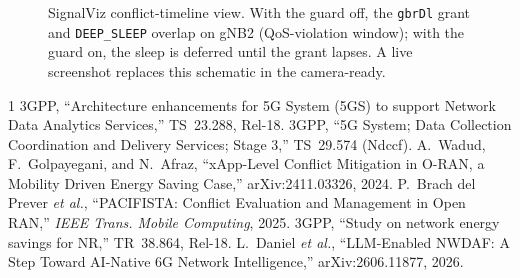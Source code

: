 \documentclass[conference]{IEEEtran}
\begin{document}

\begin{figure}[!t]
\centering
\caption{SignalViz conflict-timeline view. With the guard off, the
\texttt{gbrDl} grant and \texttt{DEEP\_SLEEP} overlap on gNB2 (QoS-violation
window); with the guard on, the sleep is deferred until the grant lapses. A
live screenshot replaces this schematic in the camera-ready.}
\label{fig:tl}
\end{figure}

\begin{thebibliography}{1}
 3GPP, ``Architecture enhancements for 5G System (5GS) to
support Network Data Analytics Services,'' TS~23.288, Rel-18.
 3GPP, ``5G System; Data Collection Coordination and Delivery
Services; Stage 3,'' TS~29.574 (Ndccf).
 A.~Wadud, F.~Golpayegani, and N.~Afraz, ``xApp-Level Conflict
Mitigation in O-RAN, a Mobility Driven Energy Saving Case,'' arXiv:2411.03326,
2024.
 P.~Brach del Prever \emph{et al.}, ``PACIFISTA: Conflict
Evaluation and Management in Open RAN,'' \emph{IEEE Trans. Mobile Computing},
2025.
 3GPP, ``Study on network energy savings for NR,'' TR~38.864,
Rel-18.
 L.~Daniel \emph{et al.}, ``LLM-Enabled NWDAF: A Step Toward
AI-Native 6G Network Intelligence,'' arXiv:2606.11877, 2026.
\end{thebibliography}
\end{document}
